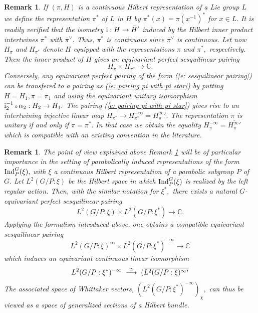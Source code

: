 \documentclass[12pt,a4paper]{article}
\newtheorem{Rem}[Thm]{Remark}
\newenvironment{rem}[0]{\begin{Rem}\noindent\rm}%
{\end{Rem}}
\def\msy#1{{\mathbb #1}}
\def\C{{\msy C}}
\def\ga{\alpha}
\def\to{\rightarrow}
\def\after{\,{\scriptstyle\circ}\,}
\numberwithin{Thm}{section}
\numberwithin{equation}{section}
\def\Ind{{\rm Ind}}
\numberwithin{equation}{section}
\def\cchi{\chi}
\def\veec{\vee}%
\begin{document}
\begin{rem}
\label{r: dual of pi}
If $(\pi, H)$ is a continuous Hilbert representation of  a Lie group $L$ we define the representation
$\pi^*$ of $L$ in $H$ by $\pi^*(x) = \pi(x^{-1})^*$ for $x \in L.$ It is readily verified
that the isometry ${\rm i}: H \to \bar H'$ induced by the Hilbert inner product 
intertwines $\pi^*$ with $\bar \pi^\veec.$ Thus, $\pi^*$ is continuous since 
$\bar\pi^\veec$ is continuous. Let now $H_\pi$ and $H_{\pi^*}$ denote
$H$ equipped with the representations $\pi$ and $\pi^*,$ respectively. 
Then the inner product of $H$ gives an equivariant perfect sesquilinear pairing
\begin{equation}
\label{e: pairing pi with pi star}
H_\pi \times H_{\pi^*}\to \C.
\end{equation}
Conversely, any equivariant perfect pairing of the form (\ref{e: sesquilinear pairing}) 
can be transfered to a pairing as (\ref{e: pairing pi with pi star}) by putting $H = H_1,  \pi = \pi_1$ 
and using the equivariant unitary isomorphism ${\rm i}_2^{-1} \after \ga_2: H_2 \to H_1.$
The pairing (\ref{e: pairing pi with pi star}) gives rise to an intertwining 
injective linear map $H_{\pi^*}  \to H_{\pi^*}^{-\infty} = \overline{{H}_{\pi}^\infty{}'}.$ The representation
$\pi$ is unitary if and only if $\pi = \pi^*.$ In that case we obtain the equality 
$H_\pi^{-\infty} = \overline{H_{\pi}^\infty{}'}$ which is compatible with an existing convention in the literature.
\end{rem}

\begin{rem} 
The point of view explained above Remark \ref{r: dual of pi} will be of particular importance in the setting
of parabolically induced representations of the form $\Ind_P^G(\xi),$ 
with $\xi$ a continuous Hilbert representation of a parabolic subgroup $P$ of $G.$ 
Let $L^2(G/P:\xi )$ be the Hilbert space in which $\Ind_P^G(\xi)$ is 
realized by the left regular action. Then, with the similar notation for $\xi^*,$  there exists a natural $G$-equivariant perfect sesquilinear pairing
$$ 
L^2(G/P:\xi ) \times L^2(G/P:\xi^*) \to \C.
$$%
Applying the formalism introduced above, one obtains a compatible equivariant
sesquilinear pairing
$$
L^2(G/P:\xi)^\infty  \times L^2(G/P:\xi^*)^{-\infty} \to \C
$$%
which induces an equivariant continuous linear isomorphism 
$$ 
L^2(G/P:\xi^*)^{-\infty} \;\;
{\buildrel  \simeq \over \longrightarrow}\;\; 
(\overline{L^2(G/P:\xi)^\infty{}'}
$$%
The associated space of Whittaker vectors,
$
(L^2(G/P:\xi^*)^{-\infty})_\cchi,
$
can thus be viewed as a space of generalized sections of a Hilbert bundle.
\end{rem}
\end{document}

